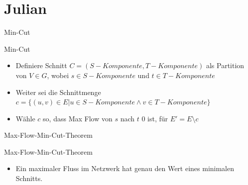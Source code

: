 \documentclass[18pt]{beamer}
\begin{document}
\section{Julian}
\begin{frame}{Min-Cut}
\begin{block}{Min-Cut}

\begin{itemize}
\item Definiere Schnitt \(C = (S-Komponente, T-Komponente)\) als Partition von \(V \in G \), wobei \(s \in S-Komponente\) und \(t \in T-Komponente\) 
\item Weiter sei die Schnittmenge \(c = \{(u, v) \in E | u \in S-Komponente \land v \in T-Komponente\}\)
\item W\"ahle \(c\) so, dass Max Flow von \(s\) nach \(t\) 0 ist, f\"ur \(E'=E\setminus c\) 
\end{itemize}
\end{block}
\end{frame}

\begin{frame}{Max-Flow-Min-Cut-Theorem}
\begin{block}{Max-Flow-Min-Cut-Theorem}
\begin{itemize}
\item Ein maximaler Fluss im Netzwerk hat genau den Wert eines minimalen Schnitts.
\end{itemize}
\end{block}
\end{frame}
\end{document}
